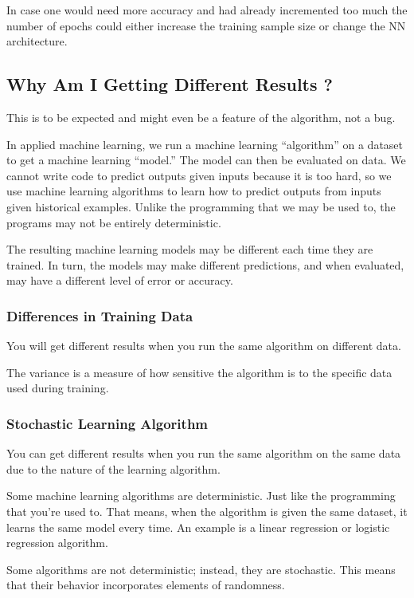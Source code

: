 In case one would need more accuracy and had already incremented too much the number of epochs could either increase the training sample size or change the NN architecture.

\subsection{Why Am I Getting Different Results ?}

This is to be expected and might even be a feature of the algorithm, not a bug.

In applied machine learning, we run a machine learning “algorithm” on a dataset to get a machine learning “model.” The model can then be evaluated on data.
We cannot write code to predict outputs given inputs because it is too hard, so we use machine learning algorithms to learn how to predict outputs from inputs given historical examples.
Unlike the programming that we may be used to, the programs may not be entirely deterministic.

The resulting machine learning models may be different each time they are trained. In turn, the models may make different predictions, and when evaluated, may have a different level of error or accuracy.

\subsubsection{Differences in Training Data}

You will get different results when you run the same algorithm on different data.

The variance is a measure of how sensitive the algorithm is to the specific data used during training.

\subsubsection{Stochastic Learning Algorithm}

You can get different results when you run the same algorithm on the same data due to the nature of the learning algorithm.

Some machine learning algorithms are deterministic. Just like the programming that you’re used to. That means, when the algorithm is given the same dataset, it learns the same model every time. An example is a linear regression or logistic regression algorithm.

Some algorithms are not deterministic; instead, they are stochastic. This means that their behavior incorporates elements of randomness.

